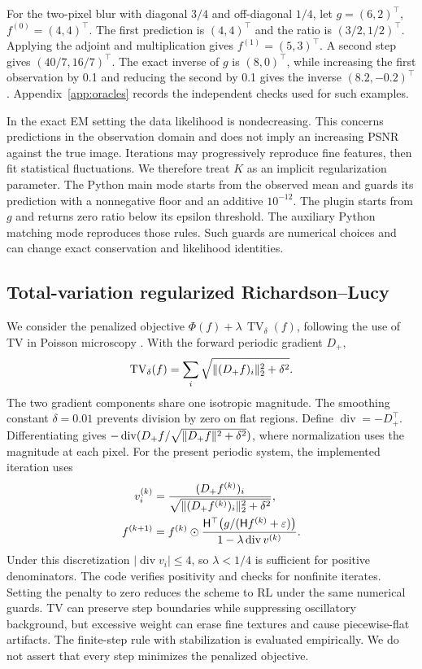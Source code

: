 For the two-pixel blur with diagonal \(3/4\) and off-diagonal \(1/4\), let \(g=(6,2)^\top\), \(f^{(0)}=(4,4)^\top\). The first prediction is \((4,4)^\top\) and the ratio is \((3/2,1/2)^\top\). Applying the adjoint and multiplication gives \(f^{(1)}=(5,3)^\top\). A second step gives \((40/7,16/7)^\top\). The exact inverse of \(g\) is \((8,0)^\top\), while increasing the first observation by 0.1 and reducing the second by 0.1 gives the inverse \((8.2,-0.2)^\top\). Appendix~\ref{app:oracles} records the independent checks used for such examples.

In the exact EM setting the data likelihood is nondecreasing. This concerns predictions in the observation domain and does not imply an increasing PSNR against the true image. Iterations may progressively reproduce fine features, then fit statistical fluctuations. We therefore treat \(K\) as an implicit regularization parameter. The Python main mode starts from the observed mean and guards its prediction with a nonnegative floor and an additive \(10^{-12}\). The plugin starts from \(g\) and returns zero ratio below its epsilon threshold. The auxiliary Python matching mode reproduces those rules. Such guards are numerical choices and can change exact conservation and likelihood identities.

\subsection{Total-variation regularized Richardson--Lucy}

We consider the penalized objective \(\Phi(f)+\lambda\,\operatorname{TV}_\delta(f)\), following the use of TV in Poisson microscopy \citep{dey,sage}. With the forward periodic gradient \(D_+\),
\begin{equation}
\operatorname{TV}_\delta(f)=\sum_i
\sqrt{\lVert(D_+f)_i\rVert_2^2+\delta^2}.
\end{equation}
The two gradient components share one isotropic magnitude. The smoothing constant \(\delta=0.01\) prevents division by zero on flat regions. Define \(\operatorname{div}=-D_+^\top\). Differentiating gives
\(-\operatorname{div}(D_+f/\sqrt{\lVert D_+f\rVert^2+\delta^2})\),
where normalization uses the magnitude at each pixel. For the present periodic system, the implemented iteration uses
\begin{align}
v^{(k)}_i &= \frac{(D_+ f^{(k)})_i}
{\sqrt{\lVert(D_+ f^{(k)})_i\rVert_2^2+\delta^2}},\\
f^{(k+1)} &= f^{(k)}\odot
\frac{\mathsf H^\top\big(g/(\mathsf H f^{(k)}+\varepsilon)\big)}
{1-\lambda\operatorname{div}v^{(k)}} .
\label{eq:rltv}
\end{align}
Under this discretization \(|\operatorname{div}v_i|\le4\), so \(\lambda<1/4\) is sufficient for positive denominators. The code verifies positivity and checks for nonfinite iterates. Setting the penalty to zero reduces the scheme to RL under the same numerical guards. TV can preserve step boundaries while suppressing oscillatory background, but excessive weight can erase fine textures and cause piecewise-flat artifacts. The finite-step rule with stabilization is evaluated empirically. We do not assert that every step minimizes the penalized objective.

